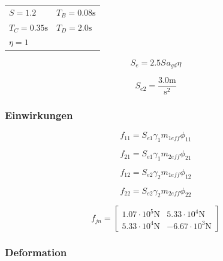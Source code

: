 \documentclass[
  letterpaper,
  DIV=11]{scrreprt}
\begin{document}
\begin{longtable}[]{@{}
  >{\raggedright\arraybackslash}p{}
  >{\raggedright\arraybackslash}p{}@{}}
\toprule\noalign{}
\endhead
\bottomrule\noalign{}
\endlastfoot
\(S = 1.2\) & \(T_{B} = 0.08 \text{s}\) \\
\(T_{C} = 0.35 \text{s}\) & \(T_{D} = 2.0 \text{s}\) \\
\(\eta = 1\) & \\
\end{longtable}

\begin{equation}S_{e} = 2.5 S_{} a_{gd} \eta\end{equation}

\begin{equation}S_{e 2} = \frac{3.0 \text{m}}{\text{s}^{2}}\end{equation}

\hypertarget{einwirkungen}{%
\subsubsection{Einwirkungen}\label{einwirkungen}}

\begin{equation}f_{11} = S_{e 1} \gamma_{1} m_{1 eff} \phi_{11}\end{equation}

\begin{equation}f_{21} = S_{e 1} \gamma_{1} m_{2 eff} \phi_{21}\end{equation}

\begin{equation}f_{12} = S_{e 2} \gamma_{2} m_{1 eff} \phi_{12}\end{equation}

\begin{equation}f_{22} = S_{e 2} \gamma_{2} m_{2 eff} \phi_{22}\end{equation}

\begin{equation}f_{jn} = \left[\begin{matrix}1.07 \cdot 10^{5} \text{N} & 5.33 \cdot 10^{4} \text{N}\\5.33 \cdot 10^{4} \text{N} & - 6.67 \cdot 10^{3} \text{N}\end{matrix}\right]\end{equation}

\hypertarget{deformation}{%
\subsubsection{Deformation}\label{deformation}}
\end{document}
